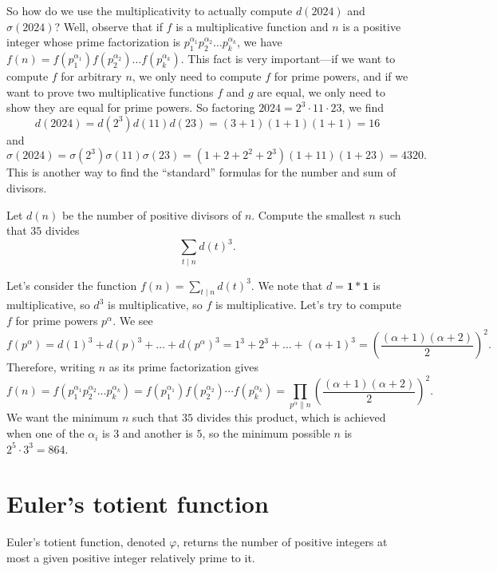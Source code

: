 \documentclass[11pt]{scrartcl}
\begin{document}
So how do we use the multiplicativity to actually compute $d(2024)$ and $\sigma(2024)$? Well, observe that if $f$ is a multiplicative function and $n$ is a positive integer whose prime factorization is $p_1^{\alpha_1}p_2^{\alpha_2}\dots p_k^{\alpha_k}$, we have $f(n) = f(p_1^{\alpha_1})f(p_2^{\alpha_2})\dots f(p_k^{\alpha_k})$. This fact is very important---if we want to compute $f$ for arbitrary $n$, we only need to compute $f$ for prime powers, and if we want to prove two multiplicative functions $f$ and $g$ are equal, we only need to show they are equal for prime powers. So factoring $2024 = 2^3 \cdot 11 \cdot 23$, we find
\[d(2024) = d(2^3)d(11)d(23) = (3 + 1)(1 + 1)(1 + 1) = 16\]
and
\[\sigma(2024) = \sigma(2^3)\sigma(11)\sigma(23) = (1 + 2 + 2^2 + 2^3)(1 + 11)(1 + 23) = 4320.\]
This is another way to find the ``standard'' formulas for the number and sum of divisors.

\begin{example}[PUMaC A 2015/N6]
	Let $d(n)$ be the number of positive divisors of $n$. Compute the smallest $n$ such that $35$ divides
	\[\sum_{t \mid n}d(t)^3.\]
\end{example}

Let's consider the function $f(n) = \sum_{t \mid n}d(t)^3$. We note that $d = \mathbf 1 \ast \mathbf 1$ is multiplicative, so $d^3$ is multiplicative, so $f$ is multiplicative. Let's try to compute $f$ for prime powers $p^\alpha$. We see
\[f(p^\alpha) = d(1)^3 + d(p)^3 + \dots + d(p^\alpha)^3 = 1^3 + 2^3 + \dots + (\alpha + 1)^3 = \left(\frac{(\alpha + 1)(\alpha + 2)}{2}\right)^2.\]
Therefore, writing $n$ as its prime factorization gives
\[f(n) = f(p_1^{\alpha_1}p_2^{\alpha_2}\dots p_k^{\alpha_k}) = f(p_1^{\alpha_1})f(p_2^{\alpha_2})\cdots f(p_k^{\alpha_k}) = \prod_{p^\alpha \parallel n}\left(\frac{(\alpha + 1)(\alpha + 2)}{2}\right)^2.\]
We want the minimum $n$ such that $35$ divides this product, which is achieved when one of the $\alpha_i$ is $3$ and another is $5$, so the minimum possible $n$ is $2^5 \cdot 3^3 = 864$.

\section{Euler's totient function}

\begin{definition}
    Euler's totient function, denoted $\varphi$, returns the number of positive integers at most a given positive integer relatively prime to it.
\end{definition}
\end{document}
